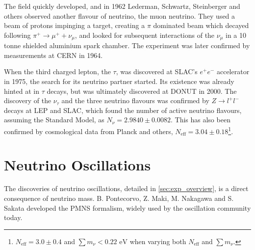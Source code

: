 The field quickly developed, and in 1962 Lederman, Schwartz, Steinberger and others\cite{lederman} observed another flavour of neutrino, the muon neutrino. They used a beam of protons impinging a target, creating a $\pi$ dominated beam which decayed following $\pi^+ \rightarrow \mu^+ + \nu_\mu$, and looked for subsequent interactions of the $\nu_\mu$ in a 10 tonne shielded aluminium spark chamber. The experiment was later confirmed by measurements at CERN in 1964\cite{cern_spark,cern_spark2}.

When the third charged lepton, the $\tau$, was discovered at SLAC's $e^+e^-$ accelerator in 1975\cite{tau_disc}, the search for its neutrino partner started. Its existence was already hinted at in $\tau$ decays, but was ultimately discovered at DONUT\cite{tau_nu_disc} in 2000. The discovery of the $\nu_\tau$ and the three neutrino flavours was confirmed by $Z \rightarrow l^+ l^-$ decays at LEP and SLAC\cite{lep}, which found the number of active neutrino flavours, assuming the Standard Model, as $N_\nu = 2.9840\pm0.0082$. This has also been confirmed by cosmological data from Planck and others\cite{planck}, $N_\text{eff} = 3.04\pm0.18$\footnote{$N_\text{eff}=3.0\pm0.4$ and $\sum m_\nu < 0.22 \text{ eV}$ when varying both $N_\text{eff}$ and $\sum m_\nu$.}.

\section{Neutrino Oscillations}
\label{sec:theory:osc}
The discoveries of neutrino oscillations, detailed in \autoref{sec:exp_overview}, is a direct consequence of neutrino mass. B. Pontecorvo\cite{p1,p2,pontecorvo_gribov}, Z. Maki, M. Nakagawa and S. Sakata\cite{mns} developed the PMNS formalism, widely used by the oscillation community today.

